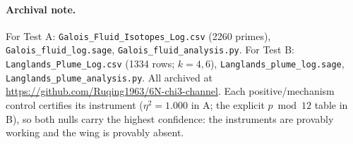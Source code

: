 \documentclass[11pt]{article}
\begin{document}
\paragraph{Archival note.} For Test A: \texttt{Galois\_Fluid\_Isotopes\_Log.csv} (2260 primes),
\texttt{Galois\_fluid\_log.sage}, \texttt{Galois\_fluid\_analysis.py}. For Test B:
\texttt{Langlands\_Plume\_Log.csv} (1334 rows; $k=4,6$), \texttt{Langlands\_plume\_log.sage},
\texttt{Langlands\_plume\_analysis.py}. All archived at
\url{https://github.com/Ruqing1963/6N-chi3-channel}. Each positive/mechanism control certifies its
instrument ($\eta^2 = 1.000$ in A; the explicit $p \bmod 12$ table in B), so both nulls carry the
highest confidence: the instruments are provably working and the wing is provably absent.
\end{document}
